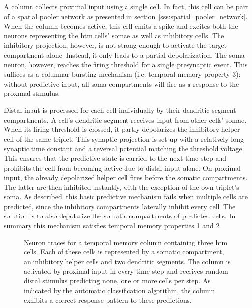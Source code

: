 A column collects proximal input using a single cell. In fact, this cell can be
part of a spatial pooler network as presented in
section~\ref{sss:spatial_pooler_network}. When the column becomes active, this
cell emits a spike and excites both the neurons representing the \gls{htm}
cells' somae as well as inhibitory cells. The inhibitory projection, however, is
not strong enough to activate the target compartment alone. Instead, it only
leads to a partial depolarization. The soma neuron, however, reaches the firing
threshold for a single presynaptic event. This suffices as a columnar bursting
mechanism (i.e. temporal memory property 3): without predictive input, all soma
compartments will fire as a response to the proximal stimulus.

Distal input is processed for each cell individually by their dendritic segment
compartments. A cell's dendritic segment receives input from other cells' somae.
When its firing threshold is crossed, it partly depolarizes the inhibitory
helper cell of the same triplet. This synaptic projection is set up with a
relatively long synaptic time constant and a reversal potential matching the
threshold voltage. This ensures that the predictive state is carried to the next
time step and prohibits the cell from becoming active due to distal input alone.
On proximal input, the already depolarized helper cell fires before the somatic
compartments. The latter are then inhibited instantly, with the exception of the
own triplet's soma. As described, this basic predictive mechanism fails when
multiple cells are predicted, since the inhibitory compartments laterally
inhibit every cell. The solution is to also depolarize the somatic
compartments of predicted cells. In summary this mechanism satisfies temporal
memory properties 1 and 2.

\begin{figure}[p]
	\begin{center}
		
	\end{center}
	\caption{Neuron traces for a temporal memory column containing three \gls{htm} cells. Each of these cells is represented by a somatic compartment, an inhibitory helper cells and two dendritic segments. The column is activated by proximal input in every time step and receives random distal stimulus predicting none, one or more cells per step. As indicated by the automatic classification algorithm, the column exhibits a correct response pattern to these predictions.}
	\label{fig:static_temporal_memory_traces}
\end{figure}
